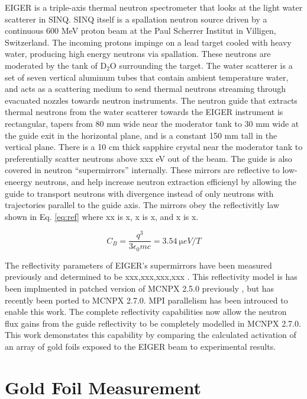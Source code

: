 \documentclass[a4paper,
              ]{jacow}
\begin{document}
EIGER is a triple-axis thermal neutron spectrometer that looks at the light water scatterer in SINQ.  SINQ itself is a spallation neutron source driven by a continuous 600 MeV proton beam at the Paul Scherrer Institut in Villigen, Switzerland.  The incoming protons impinge on a lead target cooled with heavy water, producing high energy neutrons via spallation.  These neutrons are moderated by the tank of D$_2$O surrounding the target.  The water scatterer is a set of seven vertical aluminum tubes that contain ambient temperature water, and acts as a scattering medium to send thermal neutrons streaming through evacuated nozzles towards neutron instruments.  The neutron guide that extracts thermal neutrons from the water scatterer towards the EIGER instrument is rectangular, tapers from 80 mm wide near the moderator tank to 30 mm wide at the guide exit in the horizontal plane, and is a constant 150 mm tall in the vertical plane.  There is a 10 cm thick sapphire crystal near the moderator tank to preferentially scatter neutrons above xxx eV out of the beam.  The guide is also covered in neutron ``supermirrors'' internally.  These mirrors are reflective to low-eneergy neutrons, and help increase neutron extraction efficienyl by allowing the guide to transport neutrons with divergence instead of only neutrons with trajectories parallel to the guide axis.  The mirrors obey the reflectivitly law shown in Eq. \ref{eq:ref} where xx is x, x is x, and x is x.

\begin{equation}\label{eq:ref}
    C_B=\frac{q^3}{3\epsilon_{0} mc}=\SI{3.54}{\micro eV/T}
\end{equation}

The reflectivity parameters of EIGER's supermirrors have been measured previously and determined to be xxx,xxx,xxx,xxx \cite{eiger-uwe}.  This reflectivity model is has been implmented in patched version of MCNPX 2.5.0 previously \cite{mcnpx-ref}, but has recently been ported to MCNPX 2.7.0.  MPI parallelism has been introuced to enable this work.  The complete reflectivity capabilities now allow the neutron flux gains from the guide reflectivity to be completely modelled in MCNPX 2.7.0.  This work demonstates this capability by comparing the calculated activation of an array of gold foils exposed to the EIGER beam to experimental results.


\section{Gold Foil Measurement}
\end{document}
